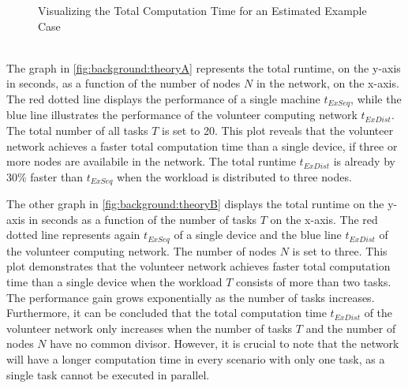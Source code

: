 \begin{figure}[htbp]
  \myfloatalign
   \caption{Visualizing the Total Computation Time for an Estimated Example Case}
   \label{fig:background:theoryplot}
\end{figure}
~\\
The graph in \autoref{fig:background:theoryA} represents the total runtime, on the y-axis in seconds, as a function of the number of nodes $N$ in the network, on the x-axis. The red dotted line displays the performance of a single machine $t_{ExSeq}$, while the blue line illustrates the performance of the volunteer computing network $t_{ExDist}$. The total number of all tasks $T$ is set to 20. This plot reveals that the volunteer network achieves a faster total computation time than a single device, if three or more nodes are availabile in the network. The total runtime $t_{ExDist}$ is already by 30\% faster than $t_{ExSeq}$ when the workload is distributed to three nodes.

The other graph in \autoref{fig:background:theoryB} displays the total runtime on the y-axis in seconds as a function of the number of tasks $T$ on the x-axis. The red dotted line represents again $t_{ExSeq}$ of a single device and the blue line $t_{ExDist}$ of the volunteer computing network. The number of nodes $N$ is set to three. This plot demonstrates that the volunteer network achieves faster total computation time than a single device when the workload $T$ consists of more than two tasks. The performance gain grows exponentially as the number of tasks increases. Furthermore, it can be concluded that the total computation time $t_{ExDist}$ of the volunteer network only increases when the number of tasks $T$ and the number of nodes $N$ have no common divisor. However, it is crucial to note that the network will have a longer computation time in every scenario with only one task, as a single task cannot be executed in parallel.

